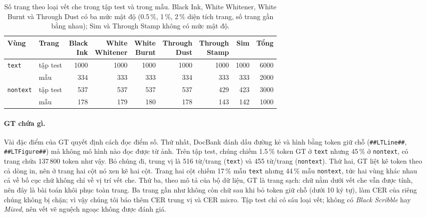 \documentclass[10pt,a4paper]{article}
\begin{document}
\begin{table}[h]
\centering\small
\caption{Số trang theo loại vết che trong tập test và trong mẫu. Black Ink, White Whitener, White Burnt và
Through Dust có ba mức mật độ (0.5\,\%, 1\,\%, 2\,\% diện tích trang, số trang gần bằng nhau); Sim và Through
Stamp không có mức mật độ.}
\label{tab:data}
\begin{tabular}{@{}llrrrrrrr@{}}
\toprule
Vùng & Trang & \shortstack[r]{Black\\Ink} & \shortstack[r]{White\\Whitener} & \shortstack[r]{White\\Burnt}
  & \shortstack[r]{Through\\Dust} & \shortstack[r]{Through\\Stamp} & Sim & Tổng \\
\midrule
\texttt{text}    & tập test & 1000 & 1000 & 1000 & 1000 & 1000 & 1000 & 6000 \\
                 & mẫu      & 334 & 333 & 333 & 334 & 333 & 333 & 2000 \\
\texttt{nontext} & tập test & 537 & 537 & 537 & 537 & 429 & 423 & 3000 \\
                 & mẫu      & 178 & 179 & 180 & 178 & 143 & 142 & 1000 \\
\bottomrule
\end{tabular}
\end{table}

\paragraph{GT chứa gì.} Vài đặc điểm của GT quyết định cách đọc điểm số. Thứ nhất, DocBank đánh dấu đường kẻ và
hình bằng token giữ chỗ (\texttt{\#\#LTLine\#\#}, \texttt{\#\#LTFigure\#\#}) mà không mô hình nào đọc được từ ảnh.
Trên tập test, chúng chiếm 1.5\,\% token GT ở \texttt{text} nhưng 45\,\% ở \texttt{nontext}, có trang chứa
137\,800 token như vậy. Bỏ chúng đi, trung vị là 516 từ/trang (\texttt{text}) và 455 từ/trang (\texttt{nontext}).
Thứ hai, GT liệt kê token theo cả dòng in, nên ở trang hai cột nó xen kẽ hai cột. Trang hai cột chiếm 17\,\%
mẫu \texttt{text} nhưng 44\,\% mẫu \texttt{nontext}, tức hai vùng khác nhau cả về bố cục chứ không chỉ về vị
trí vết che. Thứ ba, theo mô tả của bộ dữ liệu, GT là trang sạch: chữ nằm dưới vết che vẫn được tính, nên đây
là bài toán khôi phục toàn trang. Ba trang gần như không còn chữ sau khi bỏ token giữ chỗ (dưới 10 ký tự), làm
CER của riêng chúng không bị chặn; vì vậy chúng tôi báo thêm CER trung vị và CER micro. Tập test chỉ có sáu
loại vết; không có \textit{Black Scribble} hay \textit{Mixed}, nên vết vẽ nguệch ngoạc không được đánh giá.
\end{document}
